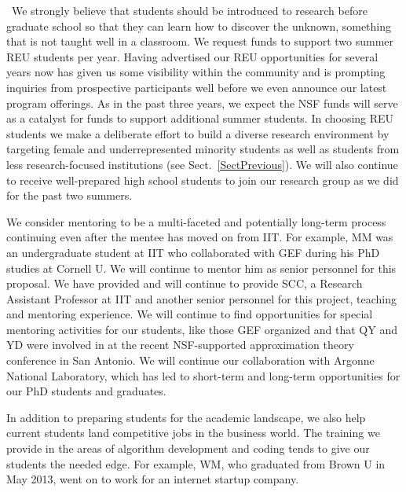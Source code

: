 \documentclass[11pt]{NSFamsart}
\begin{document}
\begin{description}[leftmargin=0ex]
\item[Providing Research Experiences for Undergraduates and High School Students]\ We \linebreak[4]    strongly believe that students should be introduced to research before graduate school so that they can learn how to discover the unknown, something that is not taught well in a classroom. We request funds to support two summer REU students per year. Having advertised our REU opportunities for several years now has given us some visibility within the community and is prompting inquiries from prospective participants well before we even announce our latest program offerings. As in the past three years, we expect the NSF funds will serve as a catalyst for funds to support additional summer students. In choosing REU students we make a deliberate effort to build a diverse research environment by targeting female and underrepresented minority students as well as students from less research-focused institutions (see Sect.~\ref{SectPrevious}). We will also continue to receive well-prepared high school students to join our research group as we did for the past two summers.

\item[Preparing Students for Academic Careers] We consider mentoring to be a multi-faceted and potentially long-term process continuing even after the mentee has moved on from IIT.  For example, MM was an undergraduate student at IIT who collaborated with GEF during his PhD studies at Cornell U.  We will continue to mentor him as senior personnel for this proposal.
    We have provided and will continue to provide SCC, a Research Assistant Professor at IIT and another senior personnel for this project, teaching and mentoring experience.  We will continue to find opportunities for special mentoring activities for our students, like those GEF organized and that QY and YD were involved in at the recent NSF-supported approximation theory conference in San Antonio.  We  will continue our collaboration with Argonne National Laboratory, which has led to short-term and long-term opportunities for our PhD students and graduates.

\item[Preparing Students for Industry Careers]
In addition to preparing students for the academic landscape, we also help current students land competitive jobs in the business world. The training we provide in the areas of algorithm development and coding tends to give our students the needed edge. For example, WM, who graduated from Brown U in May 2013, went on to work for an internet startup company.


\end{description}
\end{document}
